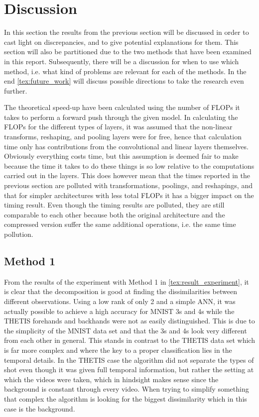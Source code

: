 \section{Discussion} \label{tex:discussion}

In this section the results from the previous section will be discussed in order to cast light on discrepancies, and to give potential explanations for them. This section will also be partitioned due to the two methods that have been examined in this report. Subsequently, there will be a discussion for when to use which method, i.e. what kind of problems are relevant for each of the methods. In the end \autoref{tex:future_work} will discuss possible directions to take the research even further.

The theoretical speed-up have been calculated using the number of FLOPs it takes to perform a forward push through the given model. In calculating the FLOPs for the different types of layers, it was assumed that the non-linear transforms, reshaping, and pooling layers were for free, hence that calculation time only has contributions from the convolutional and linear layers themselves. Obviously everything costs time, but this assumption is deemed fair to make because the time it takes to do these things is so low relative to the computations carried out in the layers. This does however mean that the times reported in the previous section are polluted with transformations, poolings, and reshapings, and that for simpler architectures with less total FLOPs it has a bigger impact on the timing result. Even though the timing results are polluted, they are still comparable to each other because both the original architecture and the compressed version suffer the same additional operations, i.e. the same time pollution.


\subsection{Method 1}
From the results of the experiment with Method 1 in \autoref{tex:result_experiment}, it is clear that the decomposition is good at finding the dissimilarities between different observations. Using a low rank of only 2 and a simple ANN, it was actually possible to achieve a high accuracy for MNIST 3s and 4s while the THETIS forehands and backhands were not as easily distinguished. This is due to the simplicity of the MNIST data set and that the 3s and 4s look very different from each other in general. This stands in contrast to the THETIS data set which is far more complex and where the key to a proper classification lies in the temporal details. In the THETIS case the algorithm did not separate the types of shot even though it was given full temporal information, but rather the setting at which the videos were taken, which in hindsight makes sense since the background is constant through every video. When trying to simplify something that complex the algorithm is looking for the biggest dissimilarity which in this case is the background.

